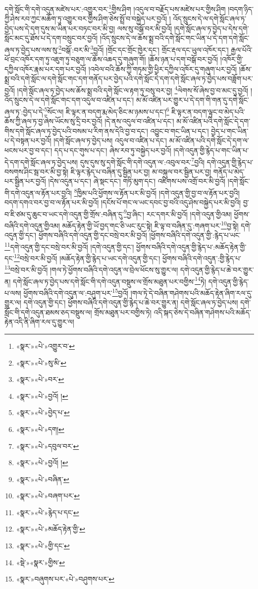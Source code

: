 དགེ་སློང་གི་དགེ་འདུན་མཛེས་པར་:འགྱུར་བར་\footnote{«སྣར་»«པེ་»འགྱུར་བ་}གྱིས་ཤིག །འདུལ་བ་བརྗོད་པས་མཛེས་པར་གྱིས་ཤིག །བདག་ཉིད་ཀྱི་ཤེས་རབ་ཀྱང་མཆོག་ཏུ་འགྱུར་བར་གྱིས་ཤིག་ཅེས་སྤྲོ་བ་བསྐྱེད་པར་བྱའོ། །
འོད་སྲུངས་དེ་ལ་དགེ་སློང་ཞལ་ཏ་བྱེད་པས་དེ་དག་དུས་མ་ཡིན་པར་བཏང་བར་མི་བྱ། ལས་སུ་བསྒོ་བར་མི་བྱའོ། །དགེ་སློང་ཞལ་ཏ་བྱེད་པ་དེས་དགེ་སློང་མང་དུ་ཐོས་པ་དེ་དག་བསྲུང་བར་བྱའོ། །འོད་སྲུངས་དེ་ལ་ཆོས་སྨྲ་བའི་དགེ་སློང་གང་ཡིན་པ་དེ་དག་དགེ་སློང་ཞལ་ཏ་བྱེད་པས་ལས་སུ་\footnote{«སྣར་»«པེ་»སུ་མི་}བསྒོ་:བར་མི་\footnote{«སྣར་»«པེ་»བར་}བྱའོ། །གྲོང་དང་གྲོང་ཁྱེར་དང་། གྲོང་རྡལ་དང་ཡུལ་འཁོར་དང་། རྒྱལ་པོའི་ཕོ་བྲང་འཁོར་དག་ཏུ་འཇུག་ཏུ་བཅུག་ལ་ཆོས་འཆད་དུ་གཞུག་གོ། །ཆོས་ཉན་པ་དག་བསྒོ་བར་བྱའོ། །འཁོར་གྱི་དཀྱིལ་འཁོར་རྣམ་པར་དག་པར་བྱའོ། །འབེལ་བའི་ཆོས་ཀྱི་གཏམ་གྱི་ཕྱིར་དཀྱིལ་འཁོར་དུ་གཞུག་པར་བྱའོ། །ཆོས་སྨྲ་བའི་དགེ་སློང་ལ་དགེ་སློང་གང་དག་གནོད་པར་བྱེད་པའི་དགེ་སློང་དེ་དག་དགེ་སློང་ཞལ་ཏ་བྱེད་པས་བཟློག་པར་བྱའོ། །དགེ་སློང་ཞལ་ཏ་བྱེད་པས་ཆོས་སྨྲ་བའི་དགེ་སློང་ལ་རྟག་ཏུ་བསུ་བར་བྱ། \footnote{«སྣར་»«པེ་»བྱའོ། ། }ལེགས་སོ་ཞེས་བྱ་བ་མང་དུ་བྱའོ། །འོད་སྲུངས་དེ་ལ་དགེ་སློང་གང་དག་འདུལ་བ་འཛིན་པ་དང་། མ་མོ་འཛིན་པར་གྱུར་པ་དེ་དག་གི་གན་དུ་དགེ་སློང་ཞལ་ཏ་:བྱེད་པ་དེ་\footnote{«སྣར་»«པེ་»བྱེད་པ་}སོང་ལ། ཇི་ལྟར་ན་བདག་རྨ་མེད་ཅིང་མ་ཉམས་པ་དང་།\footnote{«སྣར་»«པེ་»དག།} ཇི་ལྟར་ན་བདག་ལྟུང་བ་མེད་པའི་ཆོས་ཀྱི་ཞལ་ཏ་བྱ་ཞེས་ཡོངས་སུ་དྲི་བར་བྱའོ། །དེ་ནས་འདུལ་བ་འཛིན་པ་དང་། མ་མོ་འཛིན་པའི་དགེ་སློང་དེ་དག་གིས་དགེ་སློང་ཞལ་ཏ་བྱེད་པའི་བསམ་པ་རིག་ནས་དེའི་བྱ་བ་དང་། འབྱུང་བ་གང་ཡིན་པ་དང་། བྱེད་པ་གང་ཡིན་པ་དེ་བསྟན་པར་བྱའོ། །དགེ་སློང་ཞལ་ཏ་བྱེད་པས། འདུལ་བ་འཛིན་པ་དང་། མ་མོ་འཛིན་པའི་དགེ་སློང་དེ་དག་ལ་ཕངས་པར་བྱ་བ་དང་། དད་པ་དང་གུས་པ་དང་། ཞེས་རབ་ཏུ་བསྐྱེད་པར་བྱའོ། །དགེ་འདུན་གྱི་རྙེད་པ་གང་ཡིན་པ་དེ་དག་དགེ་སློང་ཞལ་ཏ་བྱེད་པས། དུས་དུས་སུ་དགེ་སློང་གི་དགེ་འདུན་ལ་:འབུལ་བར་\footnote{«སྣར་»«པེ་»དབུལ་བར་}བྱའི། དགེ་འདུན་གྱི་རྙེད་པ་བསགས་ཤིང་སྦ་བར་མི་བྱ་སྟེ། ཇི་ལྟར་རྙེད་པ་བཞིན་དུ་སྦྱིན་པར་བྱ། མ་བསྐུལ་བར་སྦྱིན་པར་བྱ། གནོད་པ་མེད་པར་སྦྱིན་པར་བྱའོ། །དེས་འདུན་པ་དང་། ཞེ་སྡང་དང་། གཏི་མུག་དང་། འཇིགས་པས་འགྲོ་བར་མི་བྱའོ། །དགེ་སློང་གི་དགེ་འདུན་ལ་རྟོན་པར་བྱའི། \footnote{«སྣར་»«པེ་»བྱའོ། ། }ཁྱིམ་པའི་ཕྱོགས་ལ་རྟོན་པར་མི་བྱའོ། །དགེ་འདུན་གྱི་བྱ་བ་ལ་རྟོན་པར་བྱའི། བདག་དགའ་བར་བྱ་བ་ལ་རྟོན་པར་མི་བྱའོ། །དངོས་པོ་གང་ལ་ཡང་དབང་བྱ་བའི་འདུ་ཤེས་བསྐྱེད་པར་མི་བྱའི། བྱ་བ་ཇི་ཙམ་དུ་ཆུང་བ་ཡང་དགེ་འདུན་གྱི་གྲོས་:བཞིན་དུ་\footnote{«སྣར་»«པེ་»བཞིན་}བྱ་ཞིང་། རང་དགར་མི་བྱའོ། །དགེ་འདུན་གྱིའམ། ཕྱོགས་བཞིའི་དགེ་འདུན་གྱིའམ། མཆོད་རྟེན་གྱི་ཡོ་བྱད་གང་ཅི་ཡང་རུང་སྟེ། ཇི་ལྟ་བ་བཞིན་དུ་:གཞག་པར་\footnote{«སྣར་»«པེ་»བཞག་པར་}བྱ་སྟེ། དགེ་འདུན་གྱི་དང་། ཕྱོགས་བཞིའི་དགེ་འདུན་གྱི་དང་བསྲེ་བར་མི་བྱའོ། །ཕྱོགས་བཞིའི་དགེ་འདུན་གྱི་:རྙེད་པ་ཡང་\footnote{«སྣར་»«པེ་»རྙེད་པ་དང་}དགེ་འདུན་གྱི་དང་བསྲེ་བར་མི་བྱའོ། །དགེ་འདུན་གྱི་དང་། ཕྱོགས་བཞིའི་དགེ་འདུན་གྱི་རྙེད་པ་:མཆོད་རྟེན་གྱི་དང་\footnote{«སྣར་»«པེ་»མཆོད་རྟེན་གྱི་}བསྲེ་བར་མི་བྱའོ། །མཆོད་རྟེན་གྱི་རྙེད་པ་ཡང་དགེ་འདུན་གྱི་དང་། ཕྱོགས་བཞིའི་དགེ་འདུན་:གྱི་རྙེད་པ་\footnote{«སྣར་»«པེ་»གྱི་དང་}བསྲེ་བར་མི་བྱའོ། །གལ་ཏེ་ཕྱོགས་བཞིའི་དགེ་འདུན་ལ་བྲེལ་ཕོངས་སུ་གྱུར་ལ། དགེ་འདུན་གྱི་རྙེད་པ་ཆེ་བར་གྱུར་ན། དགེ་སློང་ཞལ་ཏ་བྱེད་པས་དགེ་སློང་གི་དགེ་འདུན་བསྡུས་ལ་གྲོས་མཐུན་པར་བགྱིས་\footnote{«སྡེ་»«སྣར་»གྱིས་}ཏེ། དགེ་འདུན་གྱི་རྙེད་པ་ལས། ཕྱོགས་བཞིའི་དགེ་འདུན་ལ་:བཤུག་པར་\footnote{«སྣར་»བཞུགས་པར་«པེ་»བཤུགས་པར་}བྱའོ། །གལ་ཏེ་དེ་བཞིན་གཤེགས་པའི་མཆོད་རྟེན་ཞིག་རལ་དུ་གྱུར་ལ། དགེ་འདུན་གྱི་དང་། ཕྱོགས་བཞིའི་དགེ་འདུན་གྱི་རྙེད་པ་ཆེ་བར་གྱུར་ན། དགེ་སློང་ཞལ་ཏ་བྱེད་པས། དགེ་སློང་གི་དགེ་འདུན་ཐམས་ཅད་བསྡུས་ལ། གྲོས་མཐུན་པར་བགྱིས་ཏེ། འདི་སྐད་ཅེས་དེ་བཞིན་གཤེགས་པའི་མཆོད་རྟེན་འདི་ནི་ཞིག་རལ་དུ་གྱུར་ལ། 